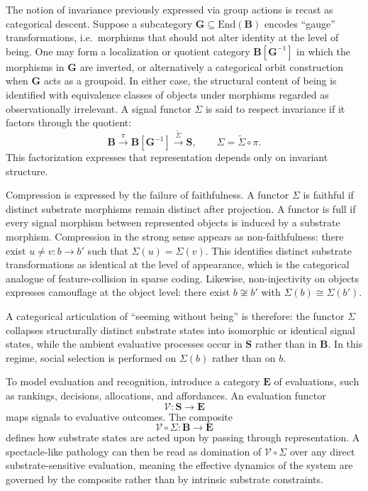 \documentclass[11pt]{article}
\begin{document}
The notion of invariance previously expressed via group actions is recast as categorical descent. Suppose a subcategory $\mathbf{G}\subseteq \mathrm{End}(\mathbf{B})$ encodes ``gauge'' transformations, i.e.\ morphisms that should not alter identity at the level of being. One may form a localization or quotient category $\mathbf{B}[\mathbf{G}^{-1}]$ in which the morphisms in $\mathbf{G}$ are inverted, or alternatively a categorical orbit construction when $\mathbf{G}$ acts as a groupoid. In either case, the structural content of being is identified with equivalence classes of objects under morphisms regarded as observationally irrelevant. A signal functor $\Sigma$ is said to respect invariance if it factors through the quotient:
\[
\mathbf{B} \xrightarrow{\pi} \mathbf{B}[\mathbf{G}^{-1}] \xrightarrow{\widetilde{\Sigma}} \mathbf{S},
\qquad
\Sigma = \widetilde{\Sigma}\circ \pi.
\]
This factorization expresses that representation depends only on invariant structure.

Compression is expressed by the failure of faithfulness. A functor $\Sigma$ is faithful if distinct substrate morphisms remain distinct after projection. A functor is full if every signal morphism between represented objects is induced by a substrate morphism. Compression in the strong sense appears as non-faithfulness: there exist $u\neq v : b\to b'$ such that $\Sigma(u)=\Sigma(v)$. This identifies distinct substrate transformations as identical at the level of appearance, which is the categorical analogue of feature-collision in sparse coding. Likewise, non-injectivity on objects expresses camouflage at the object level: there exist $b\not\cong b'$ with $\Sigma(b)\cong \Sigma(b')$.

A categorical articulation of ``seeming without being'' is therefore: the functor $\Sigma$ collapses structurally distinct substrate states into isomorphic or identical signal states, while the ambient evaluative processes occur in $\mathbf{S}$ rather than in $\mathbf{B}$. In this regime, social selection is performed on $\Sigma(b)$ rather than on $b$.

To model evaluation and recognition, introduce a category $\mathbf{E}$ of evaluations, such as rankings, decisions, allocations, and affordances. An evaluation functor
\[
\mathcal{V} : \mathbf{S} \to \mathbf{E}
\]
maps signals to evaluative outcomes. The composite
\[
\mathcal{V}\circ \Sigma : \mathbf{B} \to \mathbf{E}
\]
defines how substrate states are acted upon by passing through representation. A spectacle-like pathology can then be read as domination of $\mathcal{V}\circ\Sigma$ over any direct substrate-sensitive evaluation, meaning the effective dynamics of the system are governed by the composite rather than by intrinsic substrate constraints.
\end{document}

